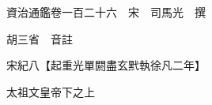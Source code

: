 










 


 
 


 

  
  
  
  
  





  
  
  
  
  
 
  

  

  
  
  



  

 
 

  
   




  

  
  


  　　資治通鑑卷一百二十六　宋　司馬光　撰

　　胡三省　音註

　　宋紀八【起重光單閼盡玄黓執徐凡二年】

　　太祖文皇帝下之上


